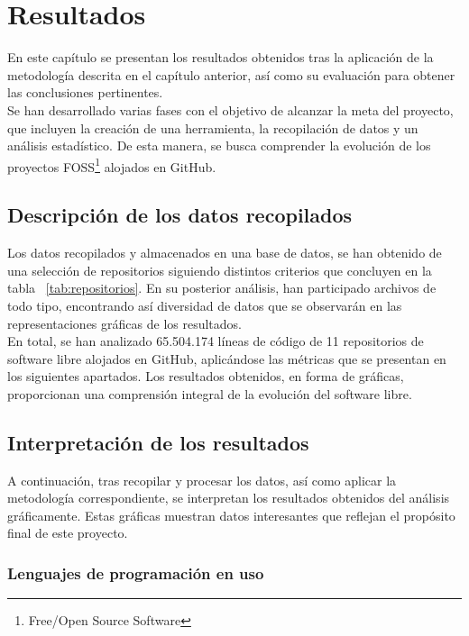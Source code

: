 \documentclass[a4paper, 12pt]{book}
\begin{document}
\cleardoublepage
\chapter{Resultados}
\label{chap:resultados}

En este capítulo se presentan los resultados obtenidos tras la aplicación de la metodología descrita en el capítulo anterior, así como su evaluación para obtener las
conclusiones pertinentes.
\\Se han desarrollado varias fases con el objetivo de alcanzar la meta del proyecto, que incluyen la creación de una herramienta, la recopilación de datos y un análisis
estadístico. De esta manera, se busca comprender la evolución de los proyectos FOSS\footnote{Free/Open Source Software} alojados en GitHub.

\section{Descripción de los datos recopilados} 
\label{sec:datos-recopilados}

Los datos recopilados y almacenados en una base de datos, se han obtenido de una selección de repositorios siguiendo distintos criterios que concluyen en la tabla ~\ref{tab:repositorios}.
En su posterior análisis, han participado archivos de todo tipo, encontrando así diversidad de datos que se observarán en las representaciones gráficas de los resultados.
\\En total, se han analizado 65.504.174 líneas de código de 11 repositorios de software libre alojados en GitHub, aplicándose las métricas que se presentan en los siguientes apartados.
Los resultados obtenidos, en forma de gráficas, proporcionan una comprensión integral de la evolución del software libre.

\section{Interpretación de los resultados} 
\label{sec:interpretación-resultados}

A continuación, tras recopilar y procesar los datos, así como aplicar la metodología correspondiente, se interpretan los resultados obtenidos del análisis gráficamente. Estas gráficas
muestran datos interesantes que reflejan el propósito final de este proyecto.

\subsection{Lenguajes de programación en uso}
\label{subsec:lenguajes}
\end{document}
